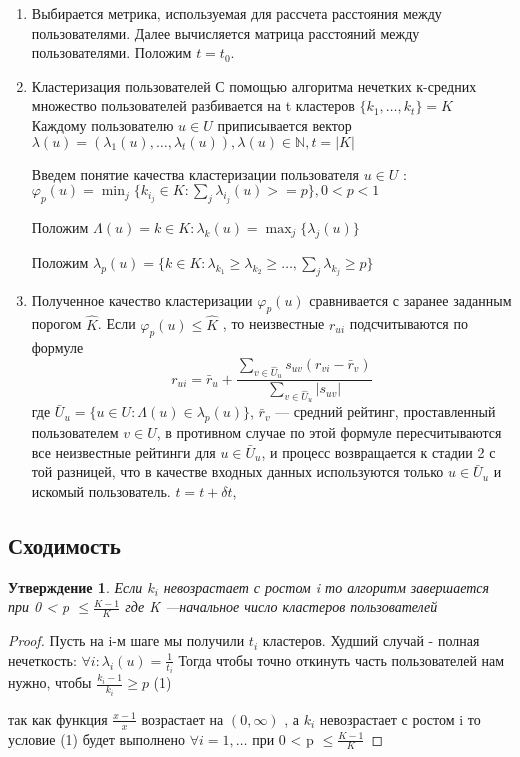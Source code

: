 \documentclass[12pt]{article} %
\newtheorem{statement}{Утверждение}
\begin{document}
\begin{enumerate} 


\item Выбирается метрика, используемая для рассчета расстояния между пользователями. Далее вычисляется матрица расстояний между пользователями. Положим $t = t_{0}$.


\item Кластеризация пользователей
С помощью алгоритма нечетких к-средних множество пользователей разбивается на t кластеров $\{k_{1},\dots,k_{t}\}=K$
Каждому пользователю $u \in U$ приписывается вектор $\lambda(u)=(\lambda_{1}(u),\dots,\lambda_{t}(u)), \lambda(u)\in\mathbb{N}, t=|K|$

Введем понятие качества кластеризации пользователя $u \in U$ :
$\varphi_{p}(u) = \min_{j} \{k_{i_{j}} \in K: \sum_{j} \lambda_{i_{j}}(u) >= p\}, 0 < p < 1$ 
\par
Положим $\Lambda(u) = k \in K: \lambda_{k}(u) = \max_{j} \{\lambda_{j}(u)\}$ 
\par
Положим $\lambda_{p}(u) = \{k \in K: \lambda_{k_{1}} \geq\lambda_{k_{2}} \geq\dots, \sum_{j}\lambda_{k_{j}} \geq p\}$

\item Полученное качество кластеризации $\varphi_{p}(u)$ сравнивается с заранее заданным порогом $\hat{K}$. Если $\varphi_{p}(u) \leq \hat{K}$ , то неизвестные $r_{ui}$ подсчитываются по формуле 
\[
	r_{ui} = \bar{r}_{u} + \frac{\sum_{v \in \hat{U}_{u}} s_{uv}(r_{vi} - \bar{r}_v)}{\sum_{v \in \hat{U}_{u}} |s_{uv}|}
\] 
где $\bar{U}_{u} = \{u \in U:\Lambda(u) \in  \lambda_{p}(u)\}$, $\bar{r}_{v}$ --- средний рейтинг, проставленный пользователем $v \in U$, в противном случае по этой формуле пересчитываются все неизвестные рейтинги для $u \in \bar{U}_{u}$, и процесс возвращается к стадии 2 с той разницей, что в качестве входных данных используются только $u \in \bar{U}_{u}$ и искомый пользователь.
$t = t + \delta t$, 

\end{enumerate}

\subsection{Сходимость}

\begin{statement}
Если $k_{i} $ невозрастает с ростом i то алгоритм завершается при   0 < p $\leq \frac {K - 1}{K}$ где K ---начальное число кластеров пользователей
\end{statement}
\begin{proof}

Пусть на i-м шаге мы получили $t_{i}$ кластеров. 
Худший случай - полная нечеткость: $\forall i: \lambda_{i}(u) = \frac{1}{t_{i}}$
Тогда чтобы точно откинуть часть пользователей нам нужно, чтобы $\frac{k_{i} - 1}{k_{i}} \geq p$ (1)
\par
так как функция $\frac{x-1}{x}$ возрастает на $(0, \infty)$ , а $k_{i} $ невозрастает с ростом i  то  условие (1) будет выполнено $\forall i = 1,\dots$ при 0 < p $\leq \frac {K - 1}{K}$
\end{proof}
\end{document}
